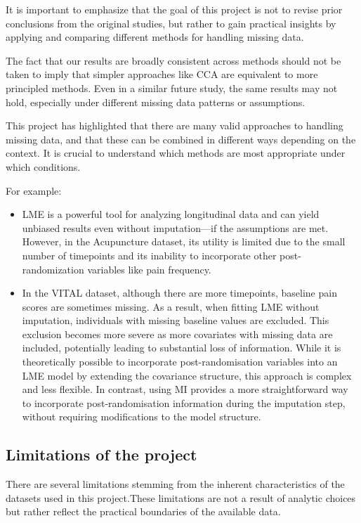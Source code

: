 \documentclass{article}
\begin{document}
It is important to emphasize that the goal of this project is not to
revise prior conclusions from the original studies, but rather to gain
practical insights by applying and comparing different methods for
handling missing data.

The fact that our results are broadly consistent across methods should
not be taken to imply that simpler approaches like CCA are equivalent to
more principled methods. Even in a similar future study, the same
results may not hold, especially under different missing data patterns
or assumptions.

This project has highlighted that there are many valid approaches to
handling missing data, and that these can be combined in different ways
depending on the context. It is crucial to understand which methods are
most appropriate under which conditions.

For example:

\begin{itemize}
\item
  LME is a powerful tool for analyzing longitudinal data and can yield
  unbiased results even without imputation---if the assumptions are met.
  However, in the Acupuncture dataset, its utility is limited due to the
  small number of timepoints and its inability to incorporate other
  post-randomization variables like pain frequency.
\item
  In the VITAL dataset, although there are more timepoints, baseline
  pain scores are sometimes missing. As a result, when fitting LME
  without imputation, individuals with missing baseline values are
  excluded. This exclusion becomes more severe as more covariates with
  missing data are included, potentially leading to substantial loss of
  information. While it is theoretically possible to incorporate
  post-randomisation variables into an LME model by extending the
  covariance structure, this approach is complex and less flexible. In
  contrast, using MI provides a more straightforward way to incorporate
  post-randomisation information during the imputation step, without
  requiring modifications to the model structure.
\end{itemize}

\subsection{Limitations of the
project}\label{limitations-of-the-project}

There are several limitations stemming from the inherent characteristics
of the datasets used in this project.These limitations are not a result
of analytic choices but rather reflect the practical boundaries of the
available data.
\end{document}

